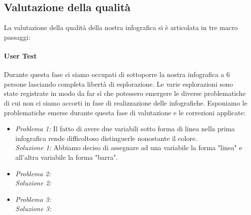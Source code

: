 \documentclass[10pt, a4paper,openany]{article}
\begin{document}
\subsection*{Valutazione della qualità}
La valutazione della qualità della nostra infografica si è articolata in tre macro passaggi:

\paragraph{User Test} Durante questa fase ci siamo occupati di sottoporre la nostra infografica a 6 persone lasciando completa libertà di esplorazione. Le varie esplorazioni sono state registrate in modo da far sì che potessero emergere le diverse problematiche di cui non ci siamo accorti in fase di realizzazione delle infografiche. Esponiamo le problematiche emerse durante questa fase di valutazione e le correzioni applicate:

\begin{itemize}
	\item \textit{Problema 1:} Il fatto di avere due variabili sotto forma di linea nella prima infografica rende difficoltoso distinguerle nonostante il colore.\\\textit{Soluzione 1:} Abbiamo deciso di assegnare ad una variabile la forma "linea" e all'altra variabile la forma "barra".
	\item  \textit{Problema 2:}\\\textit{Soluzione 2:} 
	\item  \textit{Problema 3:} \\\textit{Soluzione 3:} 
\end{itemize}
\end{document}
